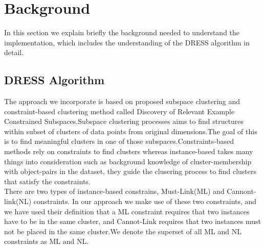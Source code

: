 \documentclass[10pt, conference, compsocconf]{IEEEtran}
\begin{document}




\section{Background}
In this section we explain briefly the background needed to understand the implementation, which includes the understanding of the DRESS algorithm in detail.

\subsection{DRESS Algorithm} The approach we incorporate is based on proposed subspace clustering and constraint-based clustering method called Discovery of Relevant Example Constrained Subspaces.Subspace clustering processes aims to find structures within subset of clusters of data points from original dimensions.The goal of this is to find meaningful clusters in one of those subspaces.Constraints-based methods rely on constraints to find clusters whereas instance-based takes many things into consideration such as background knowledge of cluster-membership with object-pairs in the dataset, they  guide the clusering process to find clusters that satisfy the constraints.\\

There are two types of instance-based constrains, Must-Link(ML) and Cannont-link(NL) constraints. In our approach we make use of these two constraints, and we have used their definition that a ML constraint
requires that two instances have to be in the same cluster, and Cannot-Link requires that two instances must not be placed in the same cluster.We denote the superset of all ML and NL constraints as ML and NL.\\ \cite{tommy}
\end{document}
